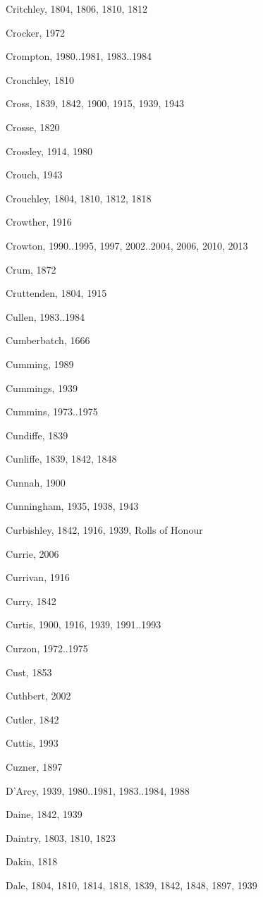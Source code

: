 {\begin{theindex}
\item Critchley, 1804, 1806, 1810, 1812
\item Crocker, 1972
\item Crompton, 1980..1981, 1983..1984
\item Cronchley, 1810
\item Cross, 1839, 1842, 1900, 1915, 1939, 1943
\item Crosse, 1820
\item Crossley, 1914, 1980
\item Crouch, 1943
\item Crouchley, 1804, 1810, 1812, 1818
\item Crowther, 1916
\item Crowton, 1990..1995, 1997, 2002..2004, 2006, 2010, 2013
\item Crum, 1872
\item Cruttenden, 1804, 1915
\item Cullen, 1983..1984
\item Cumberbatch, 1666
\item Cumming, 1989
\item Cummings, 1939
\item Cummins, 1973..1975
\item Cundiffe, 1839
\item Cunliffe, 1839, 1842, 1848
\item Cunnah, 1900
\item Cunningham, 1935, 1938, 1943
\item Curbishley, 1842, 1916, 1939, Rolls of Honour
\item Currie, 2006
\item Currivan, 1916
\item Curry, 1842
\item Curtis, 1900, 1916, 1939, 1991..1993
\item Curzon, 1972..1975
\item Cust, 1853
\item Cuthbert, 2002
\item Cutler, 1842
\item Cuttis, 1993
\item Cuzner, 1897
\item D'Arcy, 1939, 1980..1981, 1983..1984, 1988
\item Daine, 1842, 1939
\item Daintry, 1803, 1810, 1823
\item Dakin, 1818
\item Dale, 1804, 1810, 1814, 1818, 1839, 1842, 1848, 1897, 1939

\end{theindex}}
